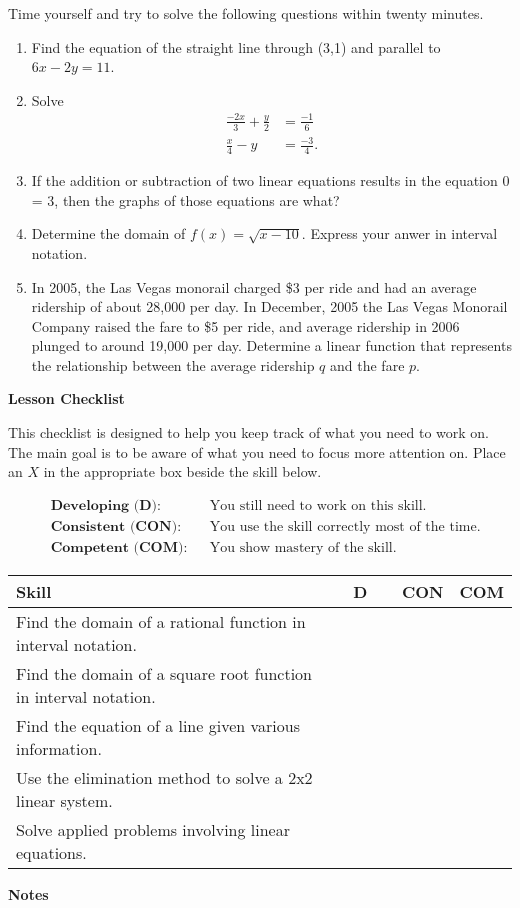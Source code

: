 \documentclass[10pt]{book}
\theoremstyle{definition}
\theoremstyle{remark}
\begin{document}
\begin{large}
\noindent
Time yourself and try to solve the following questions within twenty minutes. 
\begin{enumerate}
\item Find the equation of the straight line through (3,1) and parallel to $6x - 2y = 11$.\vfil
\item Solve \begin{align*}   \frac{-2x}{3} + \frac{y}{2} &= \frac{-1}{6}\\ \frac{x}{4}- y &= \frac{-3}{4}. \end{align*}\vfil
\item If the addition or subtraction of two linear equations results in the equation 0 = 3, then the graphs of those equations are what?\vfil
\item Determine the domain of $f(x) = \sqrt{x-10}$. Express your anwer in interval notation.\vfil
\item In 2005, the Las Vegas monorail charged \$3 per ride and had an average ridership of about 28,000 per day. In December, 2005 the Las Vegas Monorail Company raised the fare to \$5 per ride, and average ridership in 2006 plunged to around 19,000 per day. Determine a linear function that represents the relationship between the average ridership $q$ and the fare $p$.\vfil
\end{enumerate}

\noindent
\textbf{Lesson Checklist}
\bigskip

\noindent
This checklist is designed to help you keep track of what you need to work on. The main goal is to be aware of what you need to focus more attention on. Place an $X$ in the appropriate box beside the skill below. 
\bigskip

\noindent
\begin{align*}
&\textbf{Developing (D):} &&\textrm{You still need to work on this skill.}\\
&\textbf{Consistent (CON):} &&\textrm{You use the skill correctly most of the time.}\\
&\textbf{Competent (COM):} &&\textrm{You show mastery of the skill.} 
\end{align*}
\vfil

\begin{center}
\begin{tabular}{|l|l|l|l|}
\hline
\textbf{Skill} & \textbf{~~D~~} & \textbf{CON} & \textbf{COM} \\
\hline
Find the domain of a rational function in interval notation.&&&\\
\hline
Find the domain of a square root function in interval notation.&&&\\
\hline
Find the equation of a line given various information.&&&\\
\hline
Use the elimination method to solve a 2x2 linear system.&&&\\
\hline
Solve applied problems involving linear equations.&&&\\
\hline
\end{tabular}
\end{center}
 \vfil

\noindent
\textbf{Notes}
\end{large} \vfil
\newpage
\end{document}
